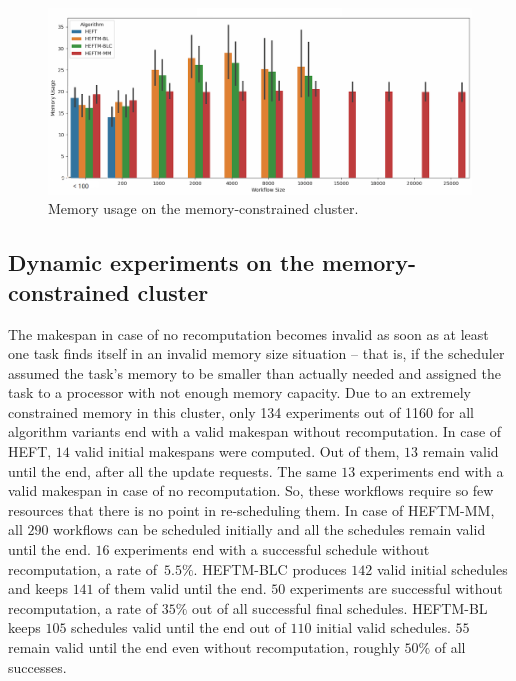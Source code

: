 \documentclass[conference]{IEEEtran}
\newcommand{\algo}[1]{\textsc{#1}}
\newcommand{\heft}{\algo{HEFT}\xspace}
\newcommand{\heftmm}{\algo{HEFTM-MM}\xspace}
\newcommand{\heftbl}{\algo{HEFTM-BL}\xspace}
\newcommand{\heftblc}{\algo{HEFTM-BLC}\xspace}
\newcommand{\AB}[1]{{\color{purple}[AB: #1]}}
\begin{document}
\begin{figure}[tb]
    \centering
    \includegraphics[width=1\columnwidth] {images/mem-usage-constrained-onlyvalid2}
    \caption{Memory usage on the memory-constrained  cluster. } %
    \label{fig:memory-usage-constrained}
\end{figure}


    
\subsection{Dynamic experiments on the memory-constrained cluster}
\label{sec.expe.dyn}

%
The makespan in case of no recomputation becomes invalid as soon as at least one task finds itself in an invalid memory size
situation -- that is, if the scheduler assumed the task's memory to be smaller than actually needed and
assigned the task to a processor with not enough memory capacity.
Due to an extremely constrained memory in this cluster, only 134 experiments out of 1160 
for all algorithm variants end with a valid makespan without recomputation.
In case of \heft, $14$ valid initial makespans were computed.
Out of them, $13$ remain valid until the end, after all the update requests.
The same $13$ experiments end with a valid makespan in case of no recomputation.
So, these workflows require so few resources that there is no point in re-scheduling them.
In case of \heftmm, all $290$ workflows can be scheduled initially and all the schedules remain valid until the end.
$16$ experiments end with a successful schedule without recomputation, a rate of~$5.5\%$.
\heftblc produces $142$ valid initial schedules and keeps $141$ of them valid until the end.
$50$ experiments are successful without recomputation, a rate of $35\%$ out of all successful final schedules.
\heftbl keeps $105$ schedules valid until the end out of $110$ initial valid schedules.
$55$ remain valid until the end even without recomputation, roughly $50\%$ of all successes.
\end{document}
